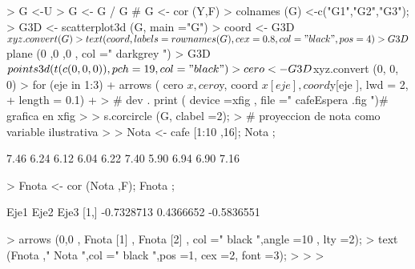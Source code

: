 \documentclass{article}
\begin{document}
\section{}

\begin{Schunk}
\begin{Sinput}
> G <-U %*% diag(sqrt(lambda)); 
> G <- G / G # G <- cor (Y,F)
> colnames (G) <-c("G1","G2","G3");
> G3D <- scatterplot3d (G, main ="G")
> coord <- G3D$xyz.convert(G)
> text (coord , labels = rownames (G), cex =0.8 , col=" black ",pos =4)
> G3D$ plane (0 ,0 ,0 , col =" darkgrey ")
> G3D$ points3d (t(c(0 ,0 ,0)) , pch =19 , col=" black ")
> cero <- G3D$xyz.convert (0, 0, 0)
> for (eje in 1:3) {
+ arrows ( cero $x, cero $y, coord $x[ eje ], coord $y[eje ], lwd = 2,
+ length = 0.1)
+ }
> # dev . print ( device =xfig , file =" cafeEspera .fig ")# grafica en xfig
> 
> s.corcircle (G, clabel =2);
> # proyeccion de nota como variable ilustrativa
> 
> Nota <- cafe [1:10 ,16]; Nota ;
\end{Sinput}
\begin{Soutput}
 [1] 7.46 6.24 6.12 6.04 6.22 7.40 5.90 6.94 6.90 7.16
\end{Soutput}
\begin{Sinput}
> Fnota <- cor (Nota ,F); Fnota ;
\end{Sinput}
\begin{Soutput}
          Eje1      Eje2       Eje3 
[1,] -0.7328713 0.4366652 -0.5836551
\end{Soutput}
\begin{Sinput}
> arrows (0,0 , Fnota [1] , Fnota [2] , col =" black ",angle =10 , lty =2);
> text (Fnota ," Nota ",col =" black ",pos =1, cex =2, font =3);
> 
> 
> 
\end{Sinput}
\end{Schunk}
\end{document}
